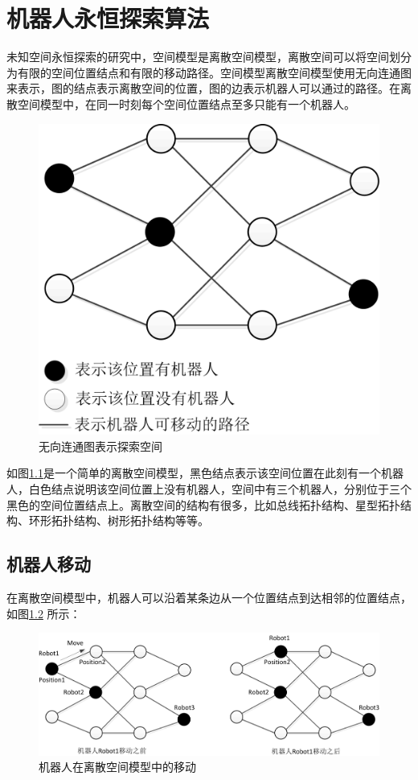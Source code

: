 \chapter{机器人永恒探索算法}
未知空间永恒探索的研究中，空间模型是离散空间模型，离散空间可以将空间划分为有限的空间位置结点和有限的移动路径。空间模型离散空间模型使用无向连通图来表示，图的结点表示离散空间的位置，图的边表示机器人可以通过的路径。在离散空间模型中，在同一时刻每个空间位置结点至多只能有一个机器人。

\begin{figure}[!hbt]
	\centering
	\includegraphics[width=3 in]{fig/normalspace.png}
	\caption{无向连通图表示探索空间}
	\label{fig:normalspace}
\end{figure}

如图\ref{fig:normalspace}是一个简单的离散空间模型，黑色结点表示该空间位置在此刻有一个机器人，白色结点说明该空间位置上没有机器人，空间中有三个机器人，分别位于三个黑色的空间位置结点上。离散空间的结构有很多，比如总线拓扑结构、星型拓扑结构、环形拓扑结构、树形拓扑结构等等。

\section{机器人移动}
在离散空间模型中，机器人可以沿着某条边从一个位置结点到达相邻的位置结点，如图\ref{fig:robotmove} 所示：

\begin{figure}[!hbt]
	\centering
	\includegraphics[width=5 in]{fig/robotmove.png}
	\caption{机器人在离散空间模型中的移动}
	\label{fig:robotmove}
\end{figure}

